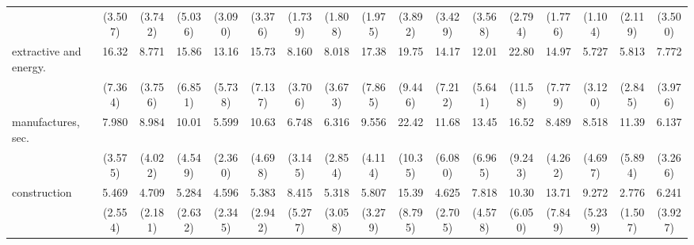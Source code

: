 {\begin{tabular}{l*{16}{c}}
                    &     (3.507)         &     (3.742)         &     (5.036)         &     (3.090)         &     (3.376)         &     (1.739)         &     (1.808)         &     (1.975)         &     (3.892)         &     (3.429)         &     (3.568)         &     (2.794)         &     (1.776)         &     (1.104)         &     (2.119)         &     (3.500)         \\
[1em]
extractive and energy.&       16.32\sym{***}&       8.771\sym{***}&       15.86\sym{***}&       13.16\sym{***}&       15.73\sym{***}&       8.160\sym{***}&       8.018\sym{***}&       17.38\sym{***}&       19.75\sym{***}&       14.17\sym{***}&       12.01\sym{***}&       22.80\sym{***}&       14.97\sym{***}&       5.727\sym{**} &       5.813\sym{***}&       7.772\sym{***}\\
                    &     (7.364)         &     (3.756)         &     (6.851)         &     (5.738)         &     (7.137)         &     (3.706)         &     (3.673)         &     (7.865)         &     (9.446)         &     (7.212)         &     (5.641)         &     (11.58)         &     (7.779)         &     (3.120)         &     (2.845)         &     (3.976)         \\
[1em]
manufactures, sec.  &       7.980\sym{***}&       8.984\sym{***}&       10.01\sym{***}&       5.599\sym{***}&       10.63\sym{***}&       6.748\sym{***}&       6.316\sym{***}&       9.556\sym{***}&       22.42\sym{***}&       11.68\sym{***}&       13.45\sym{***}&       16.52\sym{***}&       8.489\sym{***}&       8.518\sym{***}&       11.39\sym{***}&       6.137\sym{***}\\
                    &     (3.575)         &     (4.022)         &     (4.549)         &     (2.360)         &     (4.698)         &     (3.145)         &     (2.854)         &     (4.114)         &     (10.35)         &     (6.080)         &     (6.965)         &     (9.243)         &     (4.262)         &     (4.697)         &     (5.894)         &     (3.266)         \\
[1em]
construction        &       5.469\sym{***}&       4.709\sym{***}&       5.284\sym{***}&       4.596\sym{**} &       5.383\sym{**} &       8.415\sym{***}&       5.318\sym{**} &       5.807\sym{**} &       15.39\sym{***}&       4.625\sym{**} &       7.818\sym{***}&       10.30\sym{***}&       13.71\sym{***}&       9.272\sym{***}&       2.776         &       6.241\sym{**} \\
                    &     (2.554)         &     (2.181)         &     (2.632)         &     (2.345)         &     (2.942)         &     (5.277)         &     (3.058)         &     (3.279)         &     (8.795)         &     (2.705)         &     (4.578)         &     (6.050)         &     (7.849)         &     (5.239)         &     (1.507)         &     (3.927)         \\

\end{tabular}}

